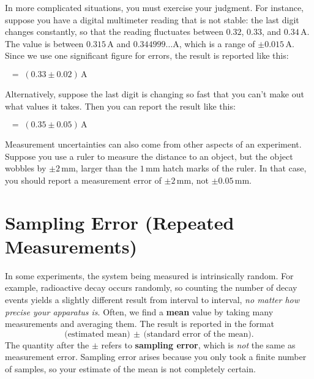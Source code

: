 \documentclass[11pt,a4paper]{article}
\begin{document}
In more complicated situations, you must exercise your judgment.  For
instance, suppose you have a digital multimeter reading that is not
stable: the last digit changes constantly, so that the reading
fluctuates between $0.32$, $0.33$, and $0.34\,\mathrm{A}$.  The value
is between $0.315\,\mathrm{A}$ and $0.344999\dots\mathrm{A}$, which is
a range of $\pm0.015\,\mathrm{A}$.  Since we use one significant
figure for errors, the result is reported like this:
\begin{center}
$\;\;=\; \left(0.33 \pm 0.02\right) \, \mathrm{A}$
\end{center}
Alternatively, suppose the last digit is changing so fast that you
can't make out what values it takes.  Then you can report the result
like this:
\begin{center}
$\;\;=\; \left(0.35 \pm 0.05\right) \, \mathrm{A}$
\end{center}

Measurement uncertainties can also come from other aspects of an
experiment.  Suppose you use a ruler to measure the distance to an
object, but the object wobbles by $\pm 2\,\textrm{mm}$, larger than
the $1\,\textrm{mm}$ hatch marks of the ruler.  In that case, you should
report a measurement error of $\pm 2\,\textrm{mm}$, not $\pm
0.05\,\textrm{mm}$.

\section{Sampling Error (Repeated Measurements)}

In some experiments, the system being measured is intrinsically
random.  For example, radioactive decay occurs randomly, so counting
the number of decay events yields a slightly different result from
interval to interval, \textit{no matter how precise your apparatus
  is}.  Often, we find a \textbf{mean} value by taking many
measurements and averaging them.  The result is reported in the format
\begin{equation*}
  \textrm{(estimated mean)} \,\pm\, \textrm{(standard error of the mean)}.
\end{equation*}
The quantity after the $\pm$ refers to \textbf{sampling error}, which
is \textit{not} the same as measurement error.  Sampling error arises
because you only took a finite number of samples, so your estimate of
the mean is not completely certain.
\end{document}
